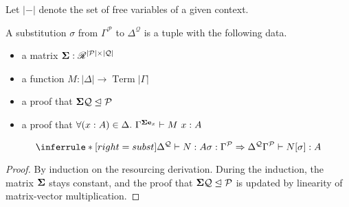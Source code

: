 Let $|-|$ denote the set of free variables of a given context.

\begin{definition}
  A substitution $\sigma$ from $\Gamma^{\mathcal P}$ to
  $\Delta^{\mathcal Q}$ is a tuple with the following data.

  \begin{itemize}
  \item a matrix $\mathbf{\Sigma} : \mathscr R^{|\mathcal P| \times |\mathcal Q|}$
  \item a function $M : |\Delta| \to \operatorname{Term} |\Gamma|$
  \item a proof that $\mathbf{\Sigma} \mathcal Q \trianglelefteq \mathcal P$
    \item a proof that $\forall (x:A) \in \Delta.~\Gamma^{\mathbf{\Sigma} \mathbf{e}_{x}}
      \vdash M~x : A$
  \end{itemize}
\end{definition}

\begin{lemma}[Substitution]
  \[
    \inferrule*[right=subst]{
      \Delta^{\mathcal Q} \vdash N : A
      \\ \sigma : \Gamma^{\mathcal P} \Rightarrow \Delta^{\mathcal Q}
    }
    {
      \Gamma^{\mathcal P} \vdash N[\sigma] : A
    }
  \]
\end{lemma}
\renewcommand{\proofname}{Proof sketch}
\begin{proof}
  By induction on the resourcing derivation.
  During the induction, the matrix $\mathbf{\Sigma}$ stays constant, and the proof
  that $\mathbf{\Sigma} \mathcal Q \trianglelefteq \mathcal P$ is updated by linearity of
  matrix-vector multiplication.
\end{proof}